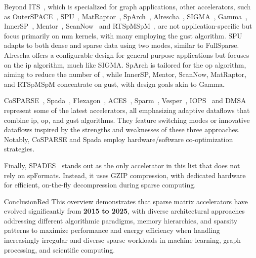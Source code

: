 Beyond ITS~\cite{Sadi2019_ITS}, which is specialized for graph applications, other accelerators, such as OuterSPACE~\cite{Pal2018_OuterSPACE}, SPU~\cite{Dadu2019_SPU}, MatRaptor~\cite{Srivastava2020_MatRaptor}, SpArch~\cite{Zhekai2020_SpArch}, Alrescha~\cite{Asgari2020_Alrescha}, SIGMA~\cite{Qin2020_SIGMA}, Gamma~\cite{Zhang2021_Gamma}, InnerSP~\cite{Baek2021_InnerSP}, Mentor~\cite{Lu2024_Mentor}, ScanNow~\cite{Ma2025_ScanNow} and RTSpMSpM~\cite{Zhang2025_RTSpMSpM}, are not application-specific but focus primarily on \acrshort{mm} kernels, with many employing the \acrfull{gust} algorithm.
SPU adapts to both dense and sparse data using two modes, similar to FullSparse.
Alrescha offers a configurable design for general purpose applications but focuses on the \acrfull{ip} algorithm, much like SIGMA.
SpArch is tailored for the \acrfull{op} algorithm, aiming to reduce the number of , while InnerSP, Mentor, ScanNow, MatRaptor, and RTSpMSpM concentrate on \acrshort{gust}, with design goals akin to Gamma.

CoSPARSE~\cite{Feng2021_CoSPARSE}, Spada~\cite{Li2023_Spada}, Flexagon~\cite{Munoz-Martinez2023_Flexagon}, ACES~\cite{Lu2024_ACES}, Sparm~\cite{Luo2024_Sparm}, Vesper~\cite{Jin2024_Vesper}, IOPS~\cite{Sun2025_IOPS} and DMSA~\cite{Nagahara2025_DMSA} represent some of the latest accelerators, all emphasizing adaptive dataflows that combine \acrshort{ip}, \acrshort{op}, and \acrshort{gust} algorithms.
They feature switching modes or innovative dataflows inspired by the strengths and weaknesses of these three approaches.
Notably, CoSPARSE and Spada employ hardware/software co-optimization strategies.

Finally, SPADES~\cite{Huang2024_SPADES} stands out as the only accelerator in this list that does not rely on \glspl{spFormat}.
Instead, it uses GZIP compression, with dedicated hardware for efficient, on-the-fly decompression during sparse computing.

\begin{highlight}{Conclusion}{Red}
    This overview demonstrates that sparse matrix accelerators have evolved significantly from \textbf{2015 to 2025}, with diverse architectural approaches addressing different algorithmic paradigms, memory hierarchies, and sparsity patterns to maximize performance and energy efficiency when handling increasingly irregular and diverse sparse workloads in machine learning, graph processing, and scientific computing.
\end{highlight}